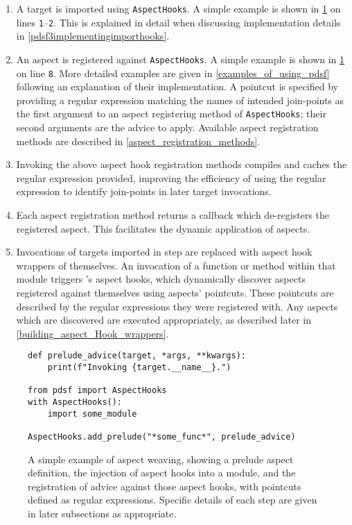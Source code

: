 \begin{enumerate}\label{urgency_mentioned_in_passing}
    \item A target is imported using \lstinline{AspectHooks}. A simple example
    is shown in \cref{fig:simple_example_of_aspect_weaving} on lines
    \texttt{1}--\texttt{2}. This is explained in detail when
    discussing implementation details in
    \cref{pdsf3implementingimporthooks}.
    \item An aspect is registered against \lstinline{AspectHooks}. A simple
    example is shown in \cref{fig:simple_example_of_aspect_weaving} on line
    \texttt{8}. More detailed examples are given in
    \cref{examples_of_using_pdsf} following an explanation of their
    implementation. A pointcut is specified by providing a regular expression
    matching the names of intended join-points as the first argument to an
    aspect registering method of \lstinline{AspectHooks}; their second arguments
    are the advice to apply. Available aspect registration methods are described
    in \cref{aspect_registration_methods}.
        \item Invoking the above aspect hook registration methods compiles and
        caches the regular expression provided, improving the efficiency of
        using the regular expression to identify join-points in later target
        invocations.
        \item Each aspect registration method returns a callback which de-registers
        the registered aspect. This facilitates the dynamic application of aspects.
    \item Invocations of targets imported in step
     are replaced with aspect hook wrappers of themselves. An
    invocation of a function or method within that module triggers
    \pdsf{}'s aspect hooks, which dynamically discover aspects registered
    against themselves using aspects' pointcuts. These pointcuts are described by the regular
    expressions they were registered with. Any aspects which are discovered are
    executed appropriately, as described later in \cref{building_aspect_Hook_wrappers}.
\end{enumerate}

\begin{figure}
    \begin{lstlisting}
def prelude_advice(target, *args, **kwargs):
    print(f"Invoking {target.__name__}.")

from pdsf import AspectHooks
with AspectHooks():
    import some_module
    
AspectHooks.add_prelude("*some_func*", prelude_advice)
    \end{lstlisting}
    \caption{A simple example of aspect weaving, showing a prelude aspect definition, the injection of aspect hooks into a module, and the registration of advice against those aspect hooks, with pointcuts defined as regular expressions. Specific details of each step are given in later subsections as appropriate.}
    \label{fig:simple_example_of_aspect_weaving}
\end{figure}

